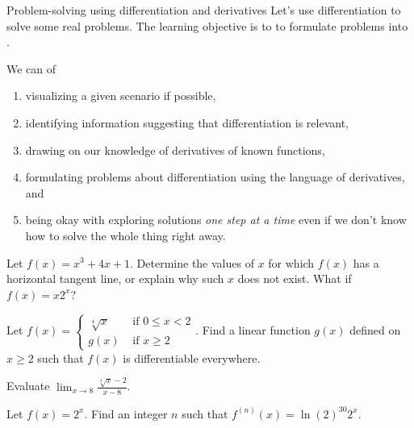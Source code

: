 \documentclass[../main.tex]{subfiles}
\begin{document}
\begin{lesson}{Problem-solving using differentiation and derivatives}
  Let's use differentiation to solve some real problems. The learning objective is to  to formulate problems into .

  \label{page:diff-problem-solving}
  We can  of
  \begin{enumerate}
    \item visualizing a given scenario if possible, 
    \item identifying information suggesting that differentiation is relevant, 
    \item drawing on our knowledge of derivatives of known functions, 
    \item formulating problems about differentiation using the language of derivatives, and
    \item being okay with exploring solutions \emph{one step at a time} even if we don't know how to solve the whole thing right away.
  \end{enumerate}

  \bigskip
  \begin{example}
    Let \(f(x) = x^{3} + 4x + 1\).  Determine the values of \(x\) for which \(f(x)\) has a horizontal tangent line, or explain why such \(x\) does not exist. What if \(f(x) = x 2^{x}\)?

  \end{example}
  \vfill{}
  \clearpage


  \begin{example}
    Let \(f(x) = \begin{cases} \sqrt[4]{x} &\text{ if } 0 \le x < 2 \\ g(x) &\text{ if } x \ge 2 \end{cases}\). Find a linear function \(g(x)\) defined on \(x \ge 2\) such that \(f(x)\) is differentiable everywhere.

  \end{example}


  \begin{example}
    Evaluate \(\lim_{x \to 8} \frac{\sqrt[3]{x} - 2}{x - 8}\).

  \end{example}
  \clearpage

  \begin{example}
    Let \(f(x) = 2^{x}\). Find an integer \(n\) such that \(f^{(n)}(x) = \ln(2)^{30} 2^{x}\).


\end{example}
\end{lesson}
\end{document}
